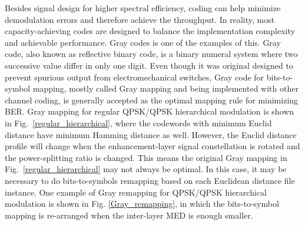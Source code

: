\documentclass[10pt,fleqn, twocolumn]{IEEEtran}
\begin{document}
Besides signal design for higher spectral efficiency, coding can
help minimize demodulation errors and therefore achieve the
throughput. In reality, most capacity-achieving codes are designed
to balance the implementation complexity and achievable
performance. Gray codes is one of the examples of this. Gray code,
also known as reflective binary code, is a binary numeral system
where two successive value differ in only one digit. Even though
it was original designed to prevent spurious output from
electromechanical switches, Gray code for bits-to-symbol mapping,
mostly called Gray mapping and being implemented with other
channel coding, is generally accepted as the optimal mapping rule
for minimizing BER. Gray mapping for regular QPSK/QPSK
hierarchical modulation is shown in
Fig.~\ref{regular_hierarchical}, where the codewords with minimum
Euclid distance have minimum Hamming distance as well. However,
the Euclid distance profile will change when the enhancement-layer
signal constellation is rotated and the power-splitting ratio is
changed. This means the original Gray mapping in
Fig.~\ref{regular_hierarchical} may not always be optimal. In this
case, it may be necessary to do bits-to-symbols remapping based on
each Euclidean distance file instance. One example of Gray
remapping for QPSK/QPSK hierarchical modulation is shown in Fig.
\ref{Gray_remapping}, in which the bits-to-symbol mapping is
re-arranged when the inter-layer MED is enough smaller.
\begin{figure}
\end{figure}
\end{document}
